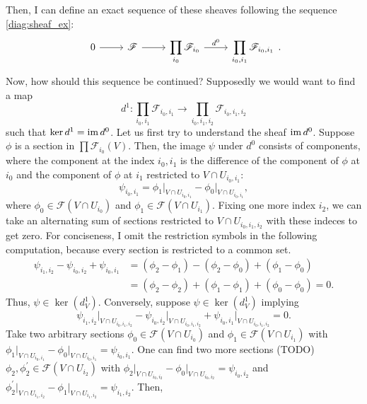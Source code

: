 Then, I can define an exact sequence of these sheaves following the sequence
\eqref{diag:sheaf_ex}:
\[\begin{tikzcd}
    0\rar & \mathscr{F}\rar
    & \displaystyle\prod_{i_{0}}\mathscr{F}_{i_{0}}\rar{d^{0}}
    & \displaystyle\prod_{i_{0},i_{1}}\mathscr{F}_{i_{0},i_{1}}
  \end{tikzcd}.\]
Now, how should this sequence be continued? Supposedly we would want to
find a map
\[
  d^{1}: \prod_{i_{0},i_{1}}\mathscr{F}_{i_{0},i_{1}}
  \to\prod_{i_{0},i_{1},i_{2}}\mathscr{F}_{i_{0},i_{1},i_{2}}
\]
such that $\ker d^{1}=\operatorname{im} d^{0}$. Let us first try to understand the sheaf
$\operatorname{im} d^{0}$. Suppose $\phi$ is a section in
$\displaystyle\prod\mathscr{F}_{i_{0}}(V)$. Then, the image $\psi$ under
$d^{0}$ consists of components, where the component at the index $i_{0},i_{1}$
is the difference of the component of $\phi$ at $i_{0}$ and the component of
$\phi$ at $i_{1}$ restricted to $V\cap U_{i_{0},i_{1}}$:
\[
  \psi_{i_{0},i_{1}}=\phi_{1}\vert_{V\cap U_{i_{0},i_{1}}}
  -\phi_{0}\vert_{V\cap U_{i_{0},i_{1}}},
\]
where $\phi_{0}\in\mathscr{F}(V\cap U_{i_{0}})$ and
$\phi_{1}\in\mathscr{F}(V\cap U_{i_{1}})$. Fixing one more index $i_{2}$, we
can take an alternating sum of sections restricted to
$V\cap U_{i_{0},i_{1},i_{2}}$ with these indeces to get zero. For
conciseness, I omit the restriction symbols in the following computation,
because every section is restricted to a common set.
\begin{align*}
  \psi_{i_{1},i_{2}}-\psi_{i_{0},i_{2}}+\psi_{i_{0},i_{1}}
  &=(\phi_{2}-\phi_{1})-(\phi_{2}-\phi_{0})+(\phi_{1}-\phi_{0}) \\
  &=(\phi_{2}-\phi_{2})+(\phi_{1}-\phi_{1})+(\phi_{0}-\phi_{0})=0.
\end{align*}
Thus, $\psi\in\ker(d_{V}^{1})$. Conversely, suppose $\psi\in\ker(d_{V}^{1})$
implying
\[\psi_{i_{1},i_{2}}\vert_{V\cap U_{i_{0},i_{1},i_{2}}}
-\psi_{i_{0},i_{2}}\vert_{V\cap U_{i_{0},i_{1},i_{2}}}
+\psi_{i_{0},i_{1}}\vert_{V\cap U_{i_{0},i_{1},i_{2}}}=0.\]
Take two arbitrary sections $\phi_{0}\in\mathscr{F}(V\cap U_{i_{0}})$
and $\phi_{1}\in\mathscr{F}(V\cap U_{i_{1}})$ with
$\phi_{1}\vert_{V\cap U_{i_{0},i_{1}}}-\phi_{0}\vert_{V\cap U_{i_{0},i_{1}}}
=\psi_{i_{0}, i_{1}}$. One can find two more sections (TODO)
$\phi_{2},\phi_{2}^{\prime}\in\mathscr{F}(V\cap U_{i_{2}})$ with
$\phi_{2}\vert_{V\cap U_{i_{0},i_{2}}}-\phi_{0}\vert_{V\cap U_{i_{0},i_{2}}}
=\psi_{i_{0}, i_{2}}$ and $\phi_{2}^{\prime}\vert_{V\cap U_{i_{1}, i_{2}}}
-\phi_{1}\vert_{V\cap U_{i_{1},i_{2}}}=\psi_{i_{1},i_{2}}$. Then,
